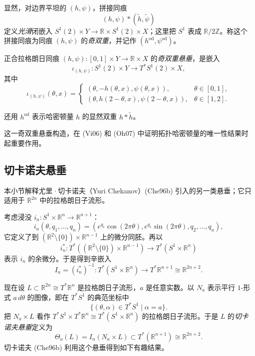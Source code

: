 显然，对边界平坦的 $(h,\psi)$，拼接同痕
\[
 (h,\psi)*(\widetilde h,\widetilde\psi)
\]
定义\emph{光滑}闭嵌入
$S^1(2)\times Y\to\mathbb R\times S^1(2)\times X$；这里把 $S^1$ 表成
$\mathbb R/2\mathbb Z$。称这个拼接同痕为同痕 $(h,\psi)$ 的\emph{奇双重}，并记作
$(h^{\mathrm{od}},\psi^{\mathrm{od}})$。

\begin{definition}\label{def:odd-double-suspension}
正合拉格朗日同痕
$(h,\psi):[0,1]\times Y\to\mathbb R\times X$ 的\emph{奇双重悬垂}，是嵌入
\[
 \iota_{(h,\psi)}:S^1(2)\times Y\longrightarrow T^*S^1(2)\times X,
\]
其中
\begin{equation}
 \iota_{(h,\psi)}(\theta,x)=
 \begin{cases}
  (\theta,-h(\theta,x),\psi(\theta,x)),&\theta\in[0,1],\\
  (\theta,h(2-\theta,x),\psi(2-\theta,x)),&\theta\in[1,2].
 \end{cases}
 \label{eq:odd-double-suspension}
\end{equation}
\end{definition}

还用 $h^{\mathrm{od}}$ 表示哈密顿量 $h$ 的显然双重 $h*\widetilde h$。

这一奇双重悬垂构造，在 (Vi06) 和 (Oh07) 中证明拓扑哈密顿量的唯一性结果时起重要作用。

\subsection{切卡诺夫悬垂}
\label{subsec:chekanov-suspension}

本小节解释尤里·切卡诺夫（Yuri Chekanov）(Che96b) 引入的另一类悬垂；它只适用于
$\mathbb R^{2n}$ 中的拉格朗日子流形。

考虑浸没 $i_n:S^1\times\mathbb R^n\to\mathbb R^{n+1}$：
\[
 i_n(\theta,q_1,\ldots,q_n)
 =(e^{q_1}\cos(2\pi\theta),e^{q_1}\sin(2\pi\theta),q_2,\ldots,q_n),
\]
它定义了到 $(\mathbb R^2\setminus\{0\})\times\mathbb R^{n-1}$ 上的微分同胚。再以
\[
 i_n^*:T^*((\mathbb R^2\setminus\{0\})\times\mathbb R^{n-1})
 \longrightarrow T^*(S^1\times\mathbb R^n)
\]
表示 $i_n$ 的余微分。于是得到辛嵌入
\[
 I_n=(i_n^*)^{-1}:T^*(S^1\times\mathbb R^n)
 \longrightarrow T^*\mathbb R^{n+1}\cong\mathbb R^{2n+2}.
\]

现在设 $L\subset\mathbb R^{2n}\cong T^*\mathbb R^n$ 是拉格朗日子流形，$a$ 是任意实数。以 $N_a$ 表示平行 $1$-形式 $a\,d\theta$ 的图像，即在 $T^*S^1$ 的典范坐标中
\[
 \{(\theta,\alpha)\in T^*S^1\mid\alpha=a\}.
\]
把 $N_a\times L$ 看作
$T^*S^1\times T^*\mathbb R^n\cong T^*(S^1\times\mathbb R^n)$ 的拉格朗日子流形。于是 $L$ 的\emph{切卡诺夫悬垂}定义为
\[
 \Theta_a(L)=I_n(N_a\times L)
 \subset T^*(\mathbb R^{n+1})\cong\mathbb R^{2n+2}.
\]
切卡诺夫 (Che96b) 利用这个悬垂得到如下有趣结果。

